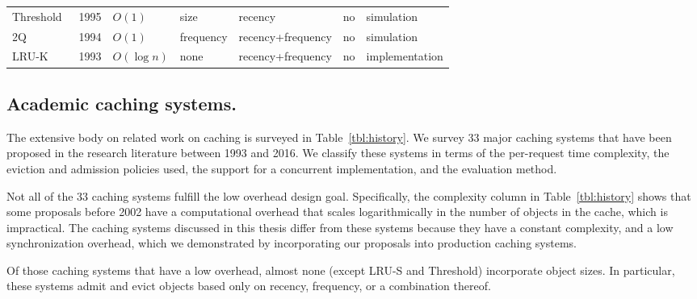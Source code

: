 \documentclass{article}
\begin{document}
\begin{table*}[!ht]
\begin{tabular}{| p{2.3cm}p{0.6cm}p{1cm}p{1.6cm}p{3.6cm}p{1.2cm}p{2.3cm}|}
    Threshold~\cite{abrams1995} & 1995 &  $O(1)$ & size & recency & no & simulation \\
    2Q~\cite{johnson19942q} & 1994 &  $O(1)$ & frequency & recency+frequency & no & simulation \\
    LRU-K~\cite{o1993lru} & 1993 &  $O(\log n)$ & none & recency+frequency & no & implementation \\
\hline
  \end{tabular}
  \caption{Historical overview of web caching systems.
   While many sophisticated eviction policies combine different properties (indicated by a ``+'' in the eviction policy column), there are only two systems (other than AdaptSize) that use size-aware admission.
   The complexity column shows that systems after 2002 have a constant per-request time complexity, whereas the complexity of some older systems depends on the number ($n$) of cached objects.
   More recently, several systems introduced concurrent caching systems.
         The last column distinguishes between evaluation through research-based prototypes (implementation) and simulation experiments.}
  \label{tbl:history}
\end{table*}

\subsection{Academic caching systems.}
The extensive body on related work on caching is surveyed in Table~\ref{tbl:history}.
We survey 33 major caching systems that have been proposed in the research literature between 1993 and 2016.
We classify these systems in terms of the per-request time complexity, the eviction and admission policies used, the support for a concurrent implementation, and the evaluation method.

Not all of the 33 caching systems fulfill the low overhead design goal.
Specifically, the complexity column in Table~\ref{tbl:history} shows that some proposals before 2002 have a computational overhead that scales logarithmically in the number of objects in the cache, which is impractical.
The caching systems discussed in this thesis differ from these systems because they have a constant complexity, and a low synchronization overhead, which we demonstrated by incorporating our proposals into production caching systems.

Of those caching systems that have a low overhead, almost none (except LRU-S and Threshold) incorporate object sizes. In particular, these systems admit and evict objects based only on recency, frequency, or a combination thereof.
\end{document}
